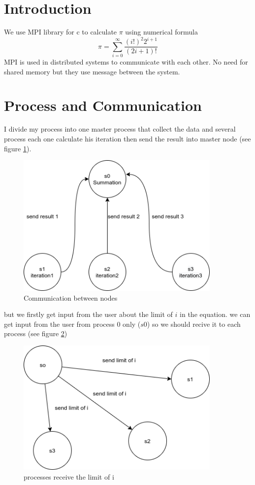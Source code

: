 \documentclass[pdftex,10pt,a4paper,oneside]{article}
\begin{document}
\pagebreak

\tableofcontents

\pagebreak

\section{Introduction}
We use MPI library for c to calculate $\pi$ using numerical formula
$$ \pi = \sum_{i = 0}^\infty \frac{(i!)^2 2^{i+1}}{(2i + 1)!} $$
MPI is used in distributed systems to communicate with each other. No need for shared memory but they use message between the system. 

\section{Process and Communication}
I divide my process into one master process that collect the data and several process each one calculate his iteration then send the result into master node (see figure \ref{s}).
\begin{figure}[H]
  \centering
  \includegraphics[width=100mm,scale=5]{m.png}
  \caption{Communication between nodes}
  \label{s}

\end{figure}
but we firstly get input from the user about the limit of $i$ in the equation. we can get input
from the user from process 0 only ($s0$) so we should recive it to each process (see figure \ref{a})
\begin{figure}[H]
  \centering
  \includegraphics[width=100mm,scale=5]{s (1).png}
  \caption{processes receive the limit of i}
  \label{a}

\end{figure}
\end{document}
